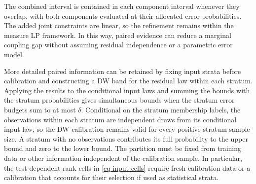 \documentclass[review,11pt,3p,authoryear,nopreprintline]{elsarticle}
\begin{document}
The combined interval is contained in each component interval whenever they overlap, with both components evaluated at their allocated error probabilities. The added joint constraints are linear, so the refinement remains within the measure LP framework. In this way, paired evidence can reduce a marginal coupling gap without assuming residual independence or a parametric error model.

More detailed paired information can be retained by fixing input strata before calibration and constructing a DW band for the residual law within each stratum. Applying the results to the conditional input laws and summing the bounds with the stratum probabilities gives simultaneous bounds when the stratum error budgets sum to at most $\delta$. Conditional on the stratum membership labels, the observations within each stratum are independent draws from its conditional input law, so the DW calibration remains valid for every positive stratum sample size. A stratum with no observations contributes its full probability to the upper bound and zero to the lower bound. The partition must be fixed from training data or other information independent of the calibration sample. In particular, the test-dependent rank cells in \eqref{eq-input-cells} require fresh calibration data or a calibration that accounts for their selection if used as statistical strata.




\end{document}
